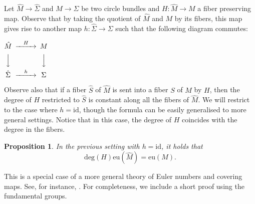 \documentclass[11pt]{amsart} %
\numberwithin{equation}{section}
\newtheorem{prop}[equation]{Proposition}
\theoremstyle{remark}
\begin{document}
Let $\hat M \rightarrow \hat \Sigma$ and $M \rightarrow \Sigma$ be two circle bundles and $H:\hat M\rightarrow M$ a fiber preserving map. Observe that by taking the quotient of $\hat M$ and $M$ by its fibers, this map gives rise to another map $h: \hat \Sigma\rightarrow\Sigma$ such that the following diagram commutes:
\begin{center}
$\begin{CD}
\hat M     @>H>>  M\\
@VVV        @VVV\\
\hat \Sigma     @>h>>  \Sigma
\end{CD}$
\end{center}
Observe also that if a fiber $\hat S$ of $\hat M$ is sent into a fiber $S$ of $M$ by $H$, then the degree of $H$ restricted to $\hat S$ is constant along all the fibers of $\hat M$. We will restrict to the case where $h=\mathrm{id}$, though the formula can be easily generalised to more general settings. Notice that in this case, the degree of $H$ coincides with the degree in the fibers. 

\begin{prop}\label{prop-Hurwitz}
In the previous setting with $h=\mathrm{id}$, it holds that 
\[\mathrm{deg}(H) \mathrm{eu}( \hat M)=\mathrm{eu}(M).\]
\end{prop} 

This is a special case of a more general theory of Euler numbers
and covering maps.
See, for instance, \cite[\S 3]{jn1983lectures}. 
For completeness, we include a short proof using the fundamental groups.
\end{document}

